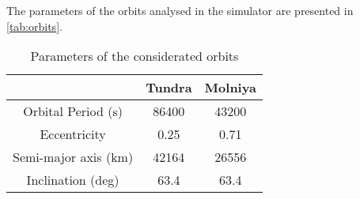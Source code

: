 The parameters of the orbits analysed in the simulator are presented in \autoref{tab:orbits}.

\begin{table}
	\centering
	\begin{tabular}{ccc}
	\toprule
	& Tundra & Molniya\\
	\midrule
	Orbital Period (s)     & 86400   & 43200\\
	Eccentricity        & 0.25   & 0.71\\
	Semi-major axis (km) & 42164 & 26556\\
	Inclination (deg)      & 63.4 & 63.4\\
	\bottomrule
	\end{tabular}
	\caption{Parameters of the considerated orbits}
	\label{tab:orbits}
\end{table}
